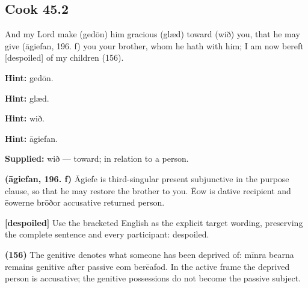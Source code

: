\par\begin{minipage}{\linewidth}\raggedright
\subsection*{Cook 45.2}

And my Lord make (gedōn) him gracious (glæd) toward (wið) you, that he may give (āgiefan, 196. f) you your brother, whom he hath with him; I am now bereft [despoiled] of my children (156).

\textbf{Hint:} gedōn.

\textbf{Hint:} glæd.

\textbf{Hint:} wið.

\textbf{Hint:} āgiefan.

\textbf{Supplied:} wið — toward; in relation to a person.

\textbf{(āgiefan, 196. f)} Āgiefe is third-singular present subjunctive in the purpose clause, so that he may restore the brother to you. Ēow is dative recipient and ēowerne brōðor accusative returned person.

\textbf{[despoiled]} Use the bracketed English as the explicit target wording, preserving the complete sentence and every participant: despoiled.

\textbf{(156)} The genitive denotes what someone has been deprived of: mīnra bearna remains genitive after passive eom berēafod. In the active frame the deprived person is accusative; the genitive possessions do not become the passive subject.

\end{minipage}\par\addvspace{4pt}

